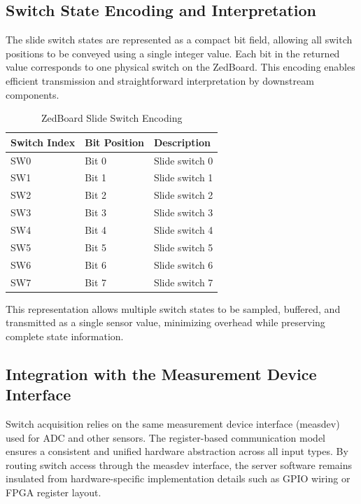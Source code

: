 \subsection{Switch State Encoding and Interpretation}
The slide switch states are represented as a compact bit field, allowing all switch positions to be conveyed using a single integer value. Each bit in the returned value corresponds to one physical switch on the ZedBoard. This encoding enables efficient transmission and straightforward interpretation by downstream components.

\begin{table}[h]
    \centering
    \begin{tabular}{|l|l|l|}
        \hline
        \textbf{Switch Index} & \textbf{Bit Position} & \textbf{Description} \\
        \hline
        SW0 & Bit 0 & Slide switch 0 \\
        \hline
        SW1 & Bit 1 & Slide switch 1 \\
        \hline
        SW2 & Bit 2 & Slide switch 2 \\
        \hline
        SW3 & Bit 3 & Slide switch 3 \\
        \hline
        SW4 & Bit 4 & Slide switch 4 \\
        \hline
        SW5 & Bit 5 & Slide switch 5 \\
        \hline
        SW6 & Bit 6 & Slide switch 6 \\
        \hline
        SW7 & Bit 7 & Slide switch 7 \\
        \hline
    \end{tabular}
    \caption{ZedBoard Slide Switch Encoding}
\end{table}

This representation allows multiple switch states to be sampled, buffered, and transmitted as a single sensor value, minimizing overhead while preserving complete state information.


\subsection{Integration with the Measurement Device Interface }
Switch acquisition relies on the same measurement device interface (measdev) used for ADC and other sensors. The register-based communication model ensures a consistent and unified hardware abstraction across all input types. By routing switch access through the measdev interface, the server software remains insulated from hardware-specific implementation details such as GPIO wiring or FPGA register layout.

